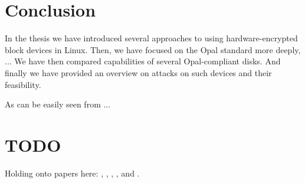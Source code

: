 















\chapter{Conclusion}

In the thesis we have introduced several approaches to using hardware-encrypted block devices in Linux. Then, we have focused on the Opal standard more deeply, ... We have then compared capabilities of several Opal-compliant disks. And finally we have provided an overview on attacks on such devices and their feasibility.

As can be easily seen from ...


\chapter{TODO}

Holding onto papers here: 
\cite{self_encrypting_deception},
\cite{self_decrypting_risks},
\cite{systematic_assessment_of_the_security},
\cite{got_hw_crypto}, and
\cite{bypassing_in_enterprise}.

\newpage

\printbibliography[heading=bibintoc] %




